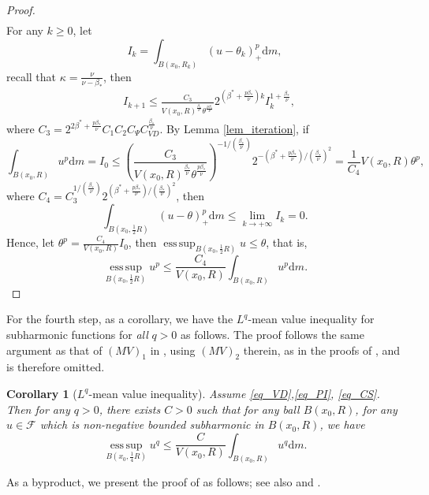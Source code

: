 \documentclass[11pt,a4paper]{article}
\numberwithin{equation}{section}
\newcommand{\esup}{\operatorname*{ess\,sup}}
\theoremstyle{plain}
\newtheorem{corollary}[theorem]{Corollary}
\theoremstyle{definition}
\begin{document}
\begin{proof}
\begin{align*}
\end{align*}
For any $k\ge0$, let
$$I_k=\int_{B(x_0,R_k)}(u-\theta_k)_+^p\mathrm{d} m,$$
recall that $\kappa=\frac{\nu}{\nu-\beta_*}$, then
\begin{align*}
&I_{k+1}\le \frac{C_3}{V(x_0,R)^{\frac{\beta_*}{\nu}}\theta^{\frac{p\beta_*}{\nu}}}2^{(\beta^*+\frac{p\beta_*}{\nu})k}I_{k}^{1+\frac{\beta_*}{\nu}},
\end{align*}
where $C_3=2^{2\beta^*+\frac{p\beta_*}{\nu}}C_1C_2C_\Psi C_{VD}^{\frac{\beta_*}{\nu}}$. By Lemma \ref{lem_iteration}, if
$$\int_{B(x_0,R)}u^p\mathrm{d} m=I_0\le \left(\frac{C_3}{V(x_0,R)^{{\frac{\beta_*}{\nu}}}\theta^{\frac{p\beta_*}{\nu}}}\right)^{-{1}/\left({\frac{\beta_*}{\nu}}\right)}2^{-(\beta^*+\frac{p\beta_*}{\nu})/(\frac{\beta_*}{\nu})^2}=\frac{1}{C_4}V(x_0,R)\theta^p,$$
where $C_4=C_3^{{1}/\left({\frac{\beta_*}{\nu}}\right)}2^{(\beta^*+\frac{p\beta_*}{\nu})/(\frac{\beta_*}{\nu})^2}$, then
$$\int_{B(x_0,\frac{1}{2}R)}(u-\theta)_+^p\mathrm{d} m\le\lim_{k\to+\infty}I_k=0.$$
Hence, let $\theta^p=\frac{C_4}{V(x_0,R)}I_0$, then $\esup_{B(x_0,\frac{1}{2}R)}u\le \theta$, that is,
$$\esup_{B(x_0,\frac{1}{2}R)}u^p\le \frac{C_4}{V(x_0,R)}\int_{B(x_0,R)}u^p\mathrm{d} m.$$
\end{proof}

For the fourth step, as a corollary, we have the $L^q$-mean value inequality for subharmonic functions for \emph{all} $q>0$ as follows. The proof follows the same argument as that of $(MV)_1$ in \cite{GHL15}, using $(MV)_2$ therein, as in the proofs of \cite[LEMMAS 9.1 and 9.2]{GHL15}, and is therefore omitted.

\begin{corollary}[$L^q$-mean value inequality]\label{cor_MVq}
Assume \ref{eq_VD},\ref{eq_PI}, \ref{eq_CS}. Then for any $q>0$, there exists $C>0$ such that for any ball $B(x_0,R)$, for any $u\in\mathcal{F}$ which is non-negative bounded subharmonic in $B(x_0,R)$, we have
$$\esup_{B(x_0,\frac{1}{4}R)}u^q\le \frac{C}{V(x_0,R)}\int_{B(x_0,R)}u^q\mathrm{d} m.$$
\end{corollary}

As a byproduct, we present the proof of \hyperlink{eq_LSC}{} as follows; see also \cite[Theorem 8.22]{BB11} and \cite[LEMMA 3.4]{TW02AJM}.
\end{document}
